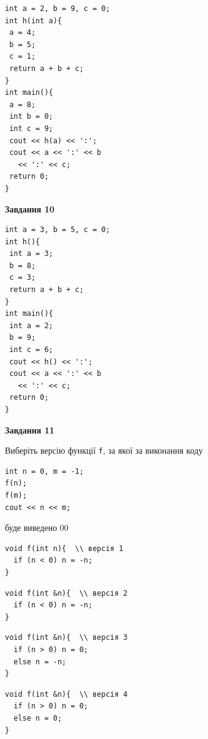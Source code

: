 \documentclass[12pt, ukrainian]{article}
\def\code#1{\Verb!#1!}
\begin{document}
{\begin {large}
\begin{minipage}[t]{7.0cm}
\begin{verbatim}
int a = 2, b = 9, c = 0;
int h(int a){
 a = 4;
 b = 5;
 c = 1;
 return a + b + c;
}
int main(){
 a = 8;
 int b = 0;
 int c = 9;
 cout << h(a) << ':';
 cout << a << ':' << b 
   << ':' << c;
 return 0;
}
\end{verbatim}



\begin{center}
\textbf{Завдання 10}
\end{center}
\vspace{-8mm}

\begin{verbatim}
int a = 3, b = 5, c = 0;
int h(){
 int a = 3;
 b = 8;
 c = 3;
 return a + b + c;
}
int main(){
 int a = 2;
 b = 9;
 int c = 6;
 cout << h() << ':';
 cout << a << ':' << b 
   << ':' << c;
 return 0;
}
\end{verbatim}

\end{minipage}
\vline \hspace{1mm}
\begin{minipage}[t]{11.0cm}

\begin{center}
\textbf{Завдання 11}
\end{center}
Виберіть версію функції \code{f}, за якої за виконання коду
\begin{verbatim}
int n = 0, m = -1;
f(n);
f(m);
cout << n << m;
\end{verbatim}

буде виведено 00

\begin{verbatim}
void f(int n){  \\ версія 1
  if (n < 0) n = -n;
}
\end{verbatim}

\vspace{-8mm}\begin{verbatim}
void f(int &n){  \\ версія 2
  if (n < 0) n = -n;
}
\end{verbatim}

\vspace{-8mm}\begin{verbatim}
void f(int &n){  \\ версія 3
  if (n > 0) n = 0;
  else n = -n;
}
\end{verbatim}

\vspace{-8mm}\begin{verbatim}
void f(int &n){  \\ версія 4
  if (n > 0) n = 0;
  else n = 0;
}
\end{verbatim}




\end{minipage}
\end{large}}
\end{document}
